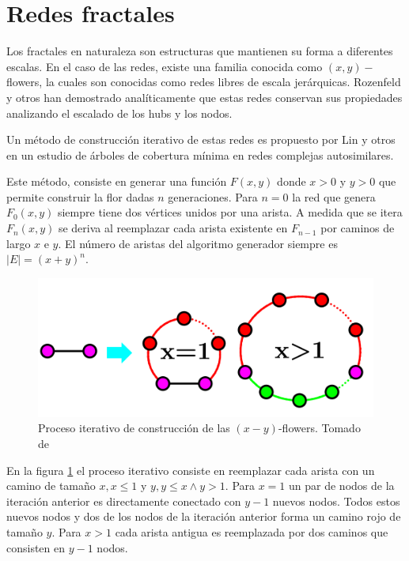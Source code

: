 \section{Redes fractales}

Los fractales en naturaleza son estructuras que mantienen su forma a diferentes escalas. En el caso de las redes, existe una familia conocida como $(x,y)-$flowers\cite{Rozenfeld2007}, la cuales son conocidas como redes libres de escala jerárquicas. Rozenfeld y otros\cite{Rozenfeld2007B} han demostrado analíticamente que estas redes conservan sus propiedades analizando el escalado de los hubs y los nodos.

Un método de construcción iterativo de estas redes es propuesto por Lin y otros\cite{Lin2011} en un estudio de árboles de cobertura mínima en redes complejas autosimilares.

Este método, consiste en generar una función $F(x,y)$ donde $x>0$ y $y>0$ que permite construir la flor dadas $n$ generaciones. Para $n=0$ la red que genera $F_0(x,y)$ siempre tiene dos vértices unidos por una arista.  A medida que se itera $F_n(x,y)$ se deriva al reemplazar cada arista existente en $F_{n-1}$ por caminos de largo $x$ e $y$. El número de aristas del algoritmo generador siempre es $|E| = (x+y)^n$. 

\begin{figure}[H]
    \centering
    \includegraphics[scale=0.5]{Capitulo3GeneracionRedesFractales/imagenes/florA.png}
    \caption{Proceso iterativo de construcción de las $(x-y)$-flowers. Tomado de \cite{Lin2011}}
    \label{fig:floarA}
\end{figure}

En la figura \ref{fig:floarA} el proceso iterativo consiste en reemplazar cada arista con un camino de tamaño $x, x\leq 1$ y $y, y\leq x \wedge y > 1$. Para $x=1$ un par de nodos de la iteración anterior es directamente conectado con $y-1$ nuevos nodos. Todos estos nuevos nodos y dos de los nodos de la iteración anterior forma un camino rojo de tamaño $y$. Para $x>1$ cada arista antigua es reemplazada por dos caminos que consisten en $y-1$ nodos.

